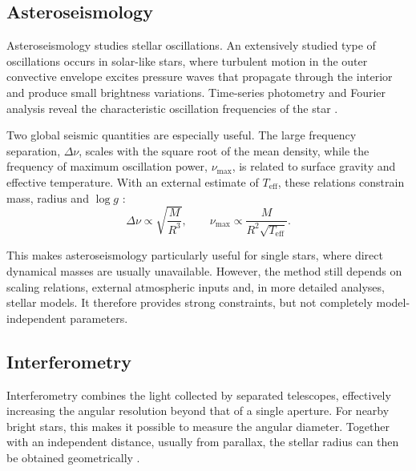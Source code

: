 \subsection{Asteroseismology}

Asteroseismology studies stellar oscillations. An extensively studied type of oscillations occurs in solar-like stars, where turbulent motion in the outer convective envelope excites pressure waves that propagate through the interior and produce small brightness variations. Time-series photometry and Fourier analysis reveal the characteristic oscillation frequencies of the star \citep{Bellinger2019,Serenelli2021}.

Two global seismic quantities are especially useful. The large frequency separation, $\Delta\nu$, scales with the square root of the mean density, while the frequency of maximum oscillation power, $\nu_{\mathrm{max}}$, is related to surface gravity and effective temperature. With an external estimate of $T_{\mathrm{eff}}$, these relations constrain mass, radius and $\log g$ \citep{chaplin2013}:
\begin{equation}
\Delta\nu \propto \sqrt{\frac{M}{R^3}}, \qquad
\nu_{\mathrm{max}} \propto \frac{M}{R^2\sqrt{T_{\mathrm{eff}}}} .
\end{equation}

This makes asteroseismology particularly useful for single stars, where direct dynamical masses are usually unavailable. However, the method still depends on scaling relations, external atmospheric inputs and, in more detailed analyses, stellar models. It therefore provides strong constraints, but not completely model-independent parameters.


\subsection{Interferometry}
Interferometry combines the light collected by separated telescopes, effectively increasing the angular resolution beyond that of a single aperture. For nearby bright stars, this makes it possible to measure the angular diameter. Together with an independent distance, usually from parallax, the stellar radius can then be obtained geometrically \citep{ligi2016}.

